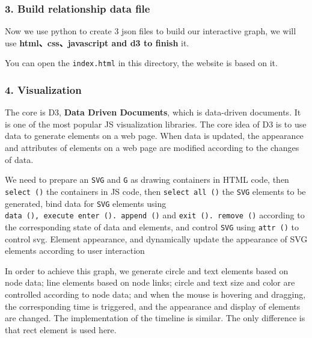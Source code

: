 \documentclass[11pt]{article}
\begin{document}
    \subsubsection{3. Build relationship data
file}\label{build-relationship-data-file}

Now we use python to create 3 json files to build our interactive graph,
we will use \textbf{html、css、javascript and d3 to finish} it.

You can open the \texttt{index.html} in this directory, the website is
based on it.

\subsubsection{4. Visualization}\label{visualization}

The core is D3, \textbf{Data Driven Documents}, which is data-driven
documents. It is one of the most popular JS visualization libraries. The
core idea of D3 is to use data to generate elements on a web page. When
data is updated, the appearance and attributes of elements on a web page
are modified according to the changes of data.

We need to prepare an \texttt{SVG} and \texttt{G} as drawing containers
in HTML code, then \texttt{select\ ()} the containers in JS code, then
\texttt{select\ all\ ()} the \texttt{SVG} elements to be generated, bind
data for \texttt{SVG} elements using
\texttt{data\ (),\ execute\ enter\ ().\ append\ ()} and
\texttt{exit\ ().\ remove\ ()} according to the corresponding state of
data and elements, and control \texttt{SVG} using \texttt{attr\ ()} to
control svg. Element appearance, and dynamically update the appearance
of SVG elements according to user interaction

In order to achieve this graph, we generate circle and text elements
based on node data; line elements based on node links; circle and text
size and color are controlled according to node data; and when the mouse
is hovering and dragging, the corresponding time is triggered, and the
appearance and display of elements are changed. The implementation of
the timeline is similar. The only difference is that rect element is
used here.


    
    
    
    
\end{document}

